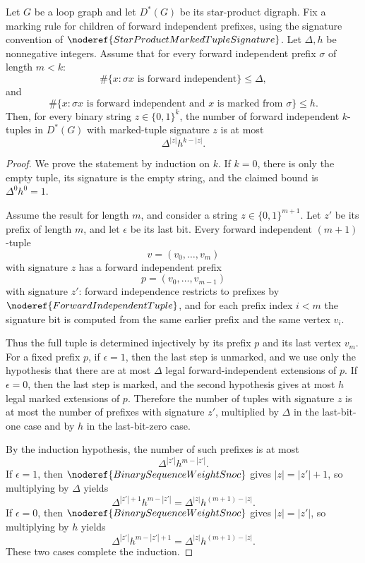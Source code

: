\begin{helper}
Let \(G\) be a loop graph and let \(D^*(G)\) be its star-product digraph.
Fix a marking rule for children of forward independent prefixes, using the
signature convention of \(\noderef{StarProductMarkedTupleSignature}\).  Let
\(\Delta,h\) be nonnegative integers.  Assume that for every
forward independent prefix \(\sigma\) of length \(m<k\):
\[
  \#\{x:\sigma x\text{ is forward independent}\}\le \Delta,
\]
and
\[
  \#\{x:\sigma x\text{ is forward independent and }x\text{ is marked
  from }\sigma\}\le h.
\]
Then, for every binary string \(z\in\{0,1\}^k\), the number of forward
independent \(k\)-tuples in \(D^*(G)\) with marked-tuple signature \(z\) is
at most
\[
  \Delta^{|z|}h^{k-|z|}.
\]
\end{helper}
\begin{proof}
We prove the statement by induction on \(k\).  If \(k=0\), there is only the
empty tuple, its signature is the empty string, and the claimed bound is
\(\Delta^0h^0=1\).

Assume the result for length \(m\), and consider a string
\(z\in\{0,1\}^{m+1}\).  Let \(z'\) be its prefix of length \(m\), and let
\(\epsilon\) be its last bit.  Every forward independent \((m+1)\)-tuple
\[
  v=(v_0,\ldots,v_m)
\]
with signature \(z\) has a forward independent prefix
\[
  p=(v_0,\ldots,v_{m-1})
\]
with signature \(z'\): forward independence restricts to prefixes by
\(\noderef{ForwardIndependentTuple}\), and for each prefix index \(i<m\) the
signature bit is computed from the same earlier prefix and the same vertex
\(v_i\).

Thus the full tuple is determined injectively by its prefix \(p\) and its
last vertex \(v_m\).  For a fixed prefix \(p\), if \(\epsilon=1\), then the
last step is unmarked, and we use only the hypothesis that there are at most
\(\Delta\) legal forward-independent extensions of \(p\).  If
\(\epsilon=0\), then the last step is marked, and the second hypothesis gives
at most \(h\) legal marked extensions of \(p\).  Therefore the number of
tuples with signature \(z\) is at most the number of prefixes with signature
\(z'\), multiplied by \(\Delta\) in the last-bit-one case and by \(h\) in
the last-bit-zero case.

By the induction hypothesis, the number of such prefixes is at most
\[
  \Delta^{|z'|}h^{m-|z'|}.
\]
If \(\epsilon=1\), then
\(\noderef{BinarySequenceWeightSnoc}\) gives \(|z|=|z'|+1\), so multiplying
by \(\Delta\) yields
\[
  \Delta^{|z'|+1}h^{m-|z'|}
  =\Delta^{|z|}h^{(m+1)-|z|}.
\]
If \(\epsilon=0\), then
\(\noderef{BinarySequenceWeightSnoc}\) gives \(|z|=|z'|\), so multiplying by
\(h\) yields
\[
  \Delta^{|z'|}h^{m-|z'|+1}
  =\Delta^{|z|}h^{(m+1)-|z|}.
\]
These two cases complete the induction.
\end{proof}
